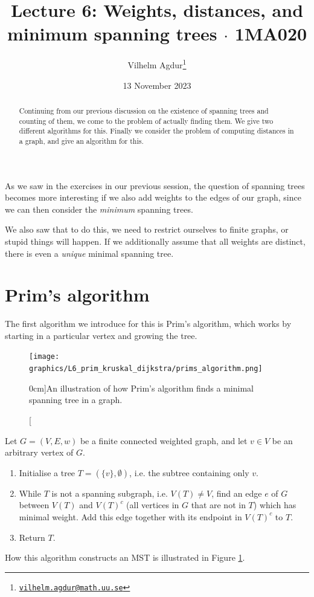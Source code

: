 \documentclass[nobib]{tufte-handout}
\title{Lecture 6: Weights, distances, and minimum spanning trees $\cdot$ 1MA020}
\author[Vilhelm Agdur]{Vilhelm Agdur\thanks{\href{mailto:vilhelm.agdur@math.uu.se}{\nolinkurl{vilhelm.agdur@math.uu.se}}}}
\date{13 November 2023}
\begin{document}
\maketitle%

\begin{abstract}
\noindent
Continuing from our previous discussion on the existence of spanning trees and counting of them, we come to the problem of actually finding them. We give two different algorithms for this. Finally we consider the problem of computing distances in a graph, and give an algorithm for this.
\end{abstract}

As we saw in the exercises in our previous session, the question of spanning trees becomes more interesting if we also add weights to the edges of our graph, since we can then consider the \emph{minimum} spanning trees.

We also saw that to do this, we need to restrict ourselves to finite graphs, or stupid things will happen. If we additionally assume that all weights are distinct, there is even a \emph{unique} minimal spanning tree.

\section{Prim's algorithm}

The first algorithm we introduce for this is Prim's algorithm, which works by starting in a particular vertex and growing the tree.

\begin{figure}
  \centering
  \texttt{[image: graphics/L6\_prim\_kruskal\_dijkstra/prims\_algorithm.png]}
  \caption[][0cm]{An illustration of how Prim's algorithm finds a minimal spanning tree in a graph.}
  \label{fig:prims_algorithm}
\end{figure}

\begin{definition}
  Let $G = (V,E,w)$ be a finite connected weighted graph, and let $v \in V$ be an arbitrary vertex of $G$.
\begin{enumerate}
    \item Initialise a tree $T = (\{v\}, \emptyset)$, i.e. the subtree containing only $v$.
    \item While $T$ is not a spanning subgraph, i.e. $V(T) \neq V$, find an edge $e$ of $G$ between $V(T)$ and $V(T)^c$ (all vertices in $G$ that are not in $T$) which has minimal weight. Add this edge together with its endpoint in $V(T)^c$ to $T$.
    \item Return $T$.
    \end{enumerate}
  How this algorithm constructs an MST is illustrated in Figure \ref{fig:prims_algorithm}.
\end{definition}
\end{document}
